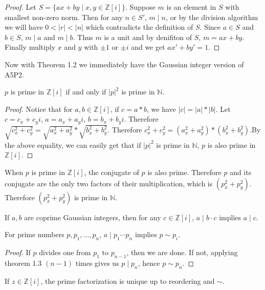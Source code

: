 \documentclass{article}
\begin{document}
\begin{proof}
Let $S=\{ax+by\mid x,y\in \mathbb{Z}[i]\}$. Suppose $m$ is an element in $S$ with smallest non-zero norm. Then for any $n \in S'$, $m \mid n$, or by the division algorithm we will have $0<|r|<|n|$ which contradicts the definition of $S$. Since $a \in S$ and $b \in S$, $m\mid a$ and $m\mid b$. Thus $m$ is a unit and by denifiton of $S$, $m = ax+by$. Finally multiply $x$ and $y$ with $\pm 1$ or $\pm i$ and we get $ax'+by' = 1$.
\end{proof}

Now with Theorem 1.2 we immediately have the Gaussian integer version of A5P2.

\begin{theorem}
$p$ is prime in $\mathbb{Z}[i]$ if and only if $|p|^2$ is prime in $\mathbb{N}$.
\end{theorem}

\begin{proof}
Notice that for $a,b \in \mathbb{Z}[i]$, if $c = a*b$, we have $|c|= |a| * |b|$. 
Let $c= c_x + c_yi$, $a= a_x + a_yi$, $b= b_x + b_yi$.
Therefore $\sqrt{c_x^2 + c_y^2}= \sqrt{a_x^2 + a_y^2}*\sqrt{b_x^2 + b_y^2}$. Therefore $c_x^2 + c_y^2= (a_x^2 + a_y^2)*(b_x^2 + b_y^2)$.By the above equality, we can easily get that if $|p|^2$ is prime in $\mathbb{N}$, $p$ is also prime in 
$\mathbb{Z}[i]$.
\end{proof}
When $p$ is prime in $\mathbb{Z}[i]$, the conjugate of $p$ is also prime. Therefore $p$ and its conjugate are the only two factors of their multiplication, which is 
$(p_x^2 + p_y^2)$. Therefore $(p_x^2 + p_y^2)$ is prime in $\mathbb{N}$.

\begin{theorem}
If $a, b$ are coprime Gaussian integers, then for any $c \in \mathbb{Z}[i]$, $a\mid b\cdot c$ implies $a\mid c$.
\end{theorem}

\begin{corollary}
For prime numbers $p,p_1, \ldots, p_n$, $a\mid p_1 \cdots p_n$ implies $p \sim p_i$.
\end{corollary}
\begin{proof}
If $p$ divides one from $p_1$ to $p_{n-1}$, then we are done. If not, applying theorem 1.3 $(n-1)$ times gives us $p \mid p_n$, hence $p \sim p_n$.
\end{proof}

\begin{theorem}
If $z \in \mathbb{Z}[i]$, the prime factorization is unique up to reordering and $\sim$.
\end{theorem}
\end{document}

